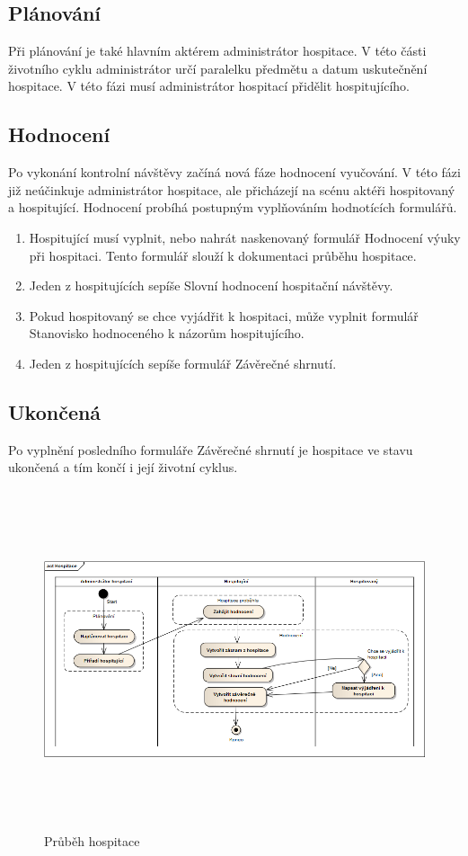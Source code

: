 \subsection{Plánování}
Při plánování je také hlavním aktérem administrátor hospitace. V této části životního cyklu administrátor určí paralelku předmětu a datum uskutečnění hospitace. V této fázi musí administrátor hospitací přidělit hospitujícího.  
 
\subsection{Hodnocení}
Po vykonání kontrolní návštěvy začíná nová fáze hodnocení vyučování. V této fázi již neúčinkuje administrátor hospitace, ale přicházejí na scénu aktéři hospitovaný a hospitující. Hodnocení probíhá postupným vyplňováním hodnotících formulářů. 
\begin{enumerate}
\item Hospitující musí vyplnit, nebo nahrát naskenovaný formulář Hodnocení výuky při hospitaci. Tento formulář slouží k dokumentaci průběhu hospitace.
\item Jeden z hospitujících sepíše Slovní hodnocení hospitační návštěvy.
\item Pokud hospitovaný se chce vyjádřit k hospitaci, může vyplnit formulář Stanovisko hodnoceného k názorům hospitujícího.
\item Jeden z hospitujících sepíše formulář Závěrečné shrnutí.
\end{enumerate}
 
\subsection{Ukončená}
Po vyplnění posledního formuláře Závěrečné shrnutí je hospitace ve stavu ukončená a tím končí i její životní cyklus.

\begin{figure}[h]
\begin{center}
\includegraphics[height=10cm,angle=270]{figures/hospitace}
\caption{Průběh hospitace}
\label{fig:hospitace}
\end{center}
\end{figure}
